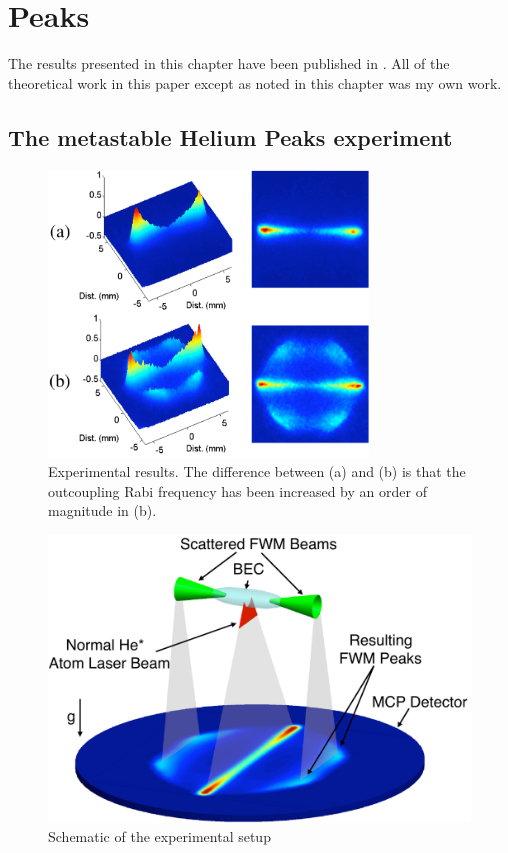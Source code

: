 \chapter{Peaks}
\label{Peaks}
\graphicspath{{Figures/Peaks/}}

The results presented in this chapter have been published in \citet{Dall:2009}. All of the theoretical work in this paper except as noted in this chapter was my own work.

\section{The metastable Helium Peaks experiment}
\label{Peaks:ExperimentalSetup}

\begin{figure}[htbp]
    \centering
        \includegraphics[height=3in]{ExperimentalResults}
    \caption{Experimental results. The difference between (a) and (b) is that the outcoupling Rabi frequency has been increased by an order of magnitude in (b).}
    \label{Peaks:ExperimentalResults}
\end{figure}

\begin{figure}[htbp]
    \centering
        \includegraphics[height=3in]{Schematic}
    \caption{Schematic of the experimental setup}
    \label{Peaks:Schematic}
\end{figure}


